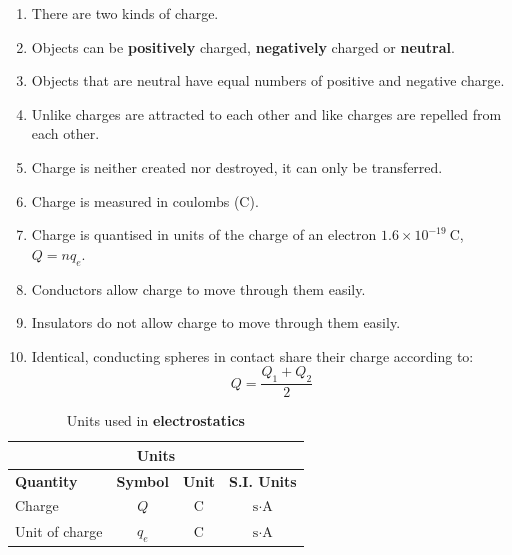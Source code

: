       \label{m38781*id201947}\begin{enumerate}[noitemsep, label=\textbf{\arabic*}. ] 
\item There are two kinds of charge.
            \label{m38781*uid14}\item Objects can be \textbf{positively} charged, \textbf{negatively} charged or \textbf{neutral}.
\label{m38781*uid15}\item Objects that are neutral have equal numbers of positive and negative charge.

\label{m38781*uid16}\item Unlike charges are attracted to each other and like charges are repelled from each other.
\label{m38781*uid17}\item Charge is neither created nor destroyed, it can only be transferred.
\label{m38781*uid18}\item Charge is measured in coulombs (C).
\item Charge is quantised in units of the charge of an electron $1.6\times10^{-19}~\text{C}$, $Q=nq_{e}$. 
\label{m38781*uid19}\item Conductors allow charge to move through them easily.
\label{m38781*uid20}\item Insulators do not allow charge to move through them easily.
\item Identical, conducting spheres in contact share their charge according to:
\begin{equation*}
 Q=\frac{Q_1+Q_2}{2}
\end{equation*}
\end{enumerate}
\begin{table}[H]
\begin{center}
\begin{tabular}{|l|c|c|c|}\hline \hline 
\multicolumn{4}{|c|}{\textbf{Units}}\\ \hline \hline
\textbf{Quantity} & \textbf{Symbol} & \textbf{Unit} & \textbf{S.I. Units}\\ \hline
Charge & $Q$ & C & $\text{s}\cdot\text{A}$ \\ \hline
Unit of charge & $q_e$ & C & $\text{s}\cdot\text{A}$ \\ \hline
\end{tabular}
\end{center}
\caption{Units used in \textbf{electrostatics} }
\label{table:electrostatics::units}
\end{table}


